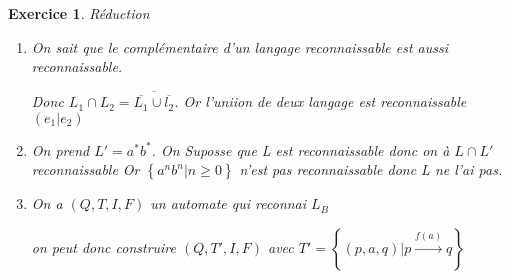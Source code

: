 \documentclass{article}
\theoremstyle{plain}
\newtheorem{exo}{Exercice}%
\begin{document}
\begin{exo} Réduction
\begin{enumerate}
\item On sait que le complémentaire d'un langage reconnaissable est aussi reconnaissable.

    Donc $L_1 \cap L_2 = \overline{\overline{L_1} \cup \overline{l_2}}$. 
    Or l'uniion de deux langage est reconnaissable $(e_1|e_2)$

\item On prend $L'=a^*b^*$. On Suposse que L est reconnaissable donc on à $L \cap L'$ reconnaissable
    Or $\left\{a^n b^n | n \geq 0\right\}$ n'est pas reconnaissable donc L ne l'ai pas.

\item On a $(Q, T, I, F)$ un automate qui reconnai $L_B$ 

    on peut donc construire 
    $(Q, T', I, F)$ avec $T' = \left\{(p, a, q)| p \overset{f(a)}{\longrightarrow} q \right\} $
\end{enumerate}
\end{exo}
\end{document}
